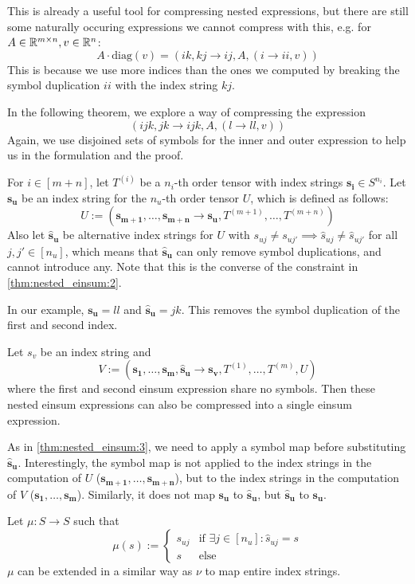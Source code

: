 This is already a useful tool for compressing nested expressions, but there are still some naturally occuring expressions we cannot compress with this,
e.g. for $A \in \mathbb{R}^{m \times n}, v \in \mathbb{R}^{n}$:
$$A \cdot \text{diag}(v) = (ik, kj \rightarrow ij, A, (i \rightarrow ii, v))$$
This is because we use more indices than the ones we computed by breaking the symbol duplication $ii$ with the index string $kj$.

In the following theorem, we explore a way of compressing the expression
$$(ijk, jk \rightarrow ijk, A, (l \rightarrow ll, v))$$
Again, we use disjoined sets of symbols for the inner and outer expression to help us in the formulation and the proof.

\begin{theorem}
    \label{thm:nested_einsum:3}

    For $i \in [m + n]$, let $T^{(i)}$ be a $n_i$-th order tensor with index strings $\bm{s_i} \in S^{n_i}$.
    Let $\bm{s_u}$ be an index string for the $n_u$-th order tensor $U$, which is defined as follows:
    $$U := (\bm{s_{m + 1}},\dots,\bm{s_{m + n}} \rightarrow \bm{s_u}, T^{(m + 1)},\dots,T^{(m + n)})$$
    Also let $\bm{\hat{s}_u}$ be alternative index strings for $U$ with $s_{uj} \neq s_{uj'} \implies \hat{s}_{uj} \neq \hat{s}_{uj'}$ for all $j, j' \in [n_u]$,
    which means that $\bm{\hat{s}_u}$ can only remove symbol duplications, and cannot introduce any.
    Note that this is the converse of the constraint in \autoref{thm:nested_einsum:2}.

    In our example, $\bm{s_u} = ll$ and $\bm{\hat{s}_u} = jk$.
    This removes the symbol duplication of the first and second index.

    Let $s_v$ be an index string and
    $$V := (\bm{s_1},\dots,\bm{s_m}, \bm{\hat{s}_u} \rightarrow \bm{s_v}, T^{(1)},\dots,T^{(m)}, U)$$
    where the first and second einsum expression share no symbols.
    Then these nested einsum expressions can also be compressed into a single einsum expression.

    As in \autoref{thm:nested_einsum:3}, we need to apply a symbol map before substituting $\bm{\hat{s}_u}$.
    Interestingly, the symbol map is not applied to the index strings in the computation of $U$ ($\bm{s_{m + 1}},\dots,\bm{s_{m + n}}$),
    but to the index strings in the computation of $V$ ($\bm{s_1},\dots,\bm{s_m}$).
    Similarly, it does not map $\bm{s_u}$ to $\bm{\hat{s}_u}$, but $\bm{\hat{s}_u}$ to $\bm{s_u}$.

    Let $\mu: S \rightarrow S$ such that
    $$\mu(s) := \begin{cases}
            s_{uj} & \text{if }\exists j \in [n_u]: \hat{s}_{uj} = s \\
            s      & \text{else}
        \end{cases}$$
    $\mu$ can be extended in a similar way as $\nu$ to map entire index strings.


\end{theorem}
